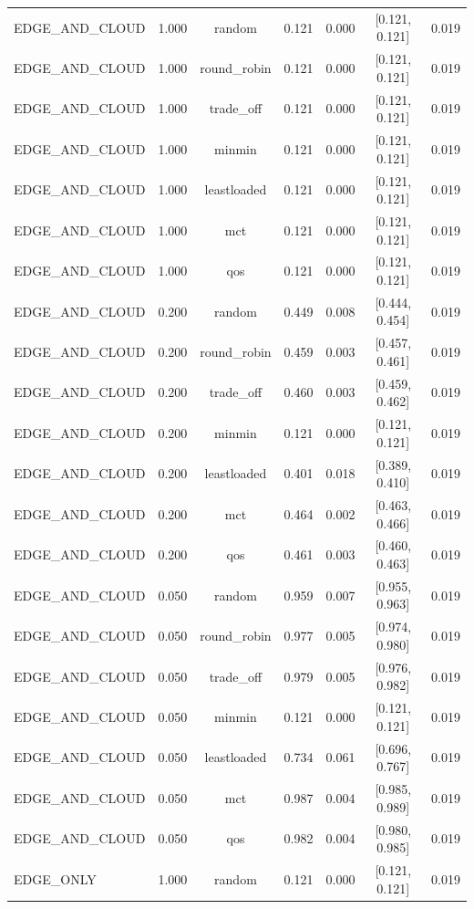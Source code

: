 \begin{table}
\begin{tabular}{lcccccc}
EDGE\_AND\_CLOUD & 1.000 & random & 0.121 & 0.000 & [0.121, 0.121] & 0.019 \\
EDGE\_AND\_CLOUD & 1.000 & round\_robin & 0.121 & 0.000 & [0.121, 0.121] & 0.019 \\
EDGE\_AND\_CLOUD & 1.000 & trade\_off & 0.121 & 0.000 & [0.121, 0.121] & 0.019 \\
EDGE\_AND\_CLOUD & 1.000 & minmin & 0.121 & 0.000 & [0.121, 0.121] & 0.019 \\
EDGE\_AND\_CLOUD & 1.000 & leastloaded & 0.121 & 0.000 & [0.121, 0.121] & 0.019 \\
EDGE\_AND\_CLOUD & 1.000 & mct & 0.121 & 0.000 & [0.121, 0.121] & 0.019 \\
EDGE\_AND\_CLOUD & 1.000 & qos & 0.121 & 0.000 & [0.121, 0.121] & 0.019 \\
EDGE\_AND\_CLOUD & 0.200 & random & 0.449 & 0.008 & [0.444, 0.454] & 0.019 \\
EDGE\_AND\_CLOUD & 0.200 & round\_robin & 0.459 & 0.003 & [0.457, 0.461] & 0.019 \\
EDGE\_AND\_CLOUD & 0.200 & trade\_off & 0.460 & 0.003 & [0.459, 0.462] & 0.019 \\
EDGE\_AND\_CLOUD & 0.200 & minmin & 0.121 & 0.000 & [0.121, 0.121] & 0.019 \\
EDGE\_AND\_CLOUD & 0.200 & leastloaded & 0.401 & 0.018 & [0.389, 0.410] & 0.019 \\
EDGE\_AND\_CLOUD & 0.200 & mct & 0.464 & 0.002 & [0.463, 0.466] & 0.019 \\
EDGE\_AND\_CLOUD & 0.200 & qos & 0.461 & 0.003 & [0.460, 0.463] & 0.019 \\
EDGE\_AND\_CLOUD & 0.050 & random & 0.959 & 0.007 & [0.955, 0.963] & 0.019 \\
EDGE\_AND\_CLOUD & 0.050 & round\_robin & 0.977 & 0.005 & [0.974, 0.980] & 0.019 \\
EDGE\_AND\_CLOUD & 0.050 & trade\_off & 0.979 & 0.005 & [0.976, 0.982] & 0.019 \\
EDGE\_AND\_CLOUD & 0.050 & minmin & 0.121 & 0.000 & [0.121, 0.121] & 0.019 \\
EDGE\_AND\_CLOUD & 0.050 & leastloaded & 0.734 & 0.061 & [0.696, 0.767] & 0.019 \\
EDGE\_AND\_CLOUD & 0.050 & mct & 0.987 & 0.004 & [0.985, 0.989] & 0.019 \\
EDGE\_AND\_CLOUD & 0.050 & qos & 0.982 & 0.004 & [0.980, 0.985] & 0.019 \\
EDGE\_ONLY & 1.000 & random & 0.121 & 0.000 & [0.121, 0.121] & 0.019 \\

\end{tabular}
\end{table}
